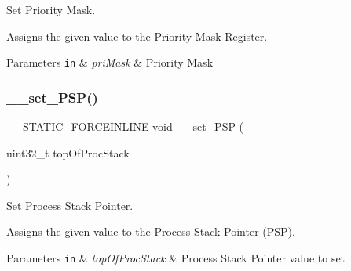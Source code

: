 Set Priority Mask. 

Assigns the given value to the Priority Mask Register. 
\begin{DoxyParams}[1]{Parameters}
\mbox{\tt in}  & {\em pri\+Mask} & Priority Mask \\
\hline
\end{DoxyParams}
\mbox{\label{group___c_m_s_i_s___core___reg_acc_functions_ga21f50fc02c3927a8ebf0bc3678c06862}} 
\subsubsection{\texorpdfstring{\+\_\+\+\_\+set\+\_\+\+P\+S\+P()}{\_\_set\_PSP()}}
{\footnotesize\ttfamily \+\_\+\+\_\+\+S\+T\+A\+T\+I\+C\+\_\+\+F\+O\+R\+C\+E\+I\+N\+L\+I\+NE void \+\_\+\+\_\+set\+\_\+\+P\+SP (\begin{DoxyParamCaption}\item[{uint32\+\_\+t}]{top\+Of\+Proc\+Stack }\end{DoxyParamCaption})}



Set Process Stack Pointer. 

Assigns the given value to the Process Stack Pointer (P\+SP). 
\begin{DoxyParams}[1]{Parameters}
\mbox{\tt in}  & {\em top\+Of\+Proc\+Stack} & Process Stack Pointer value to set \\
\hline
\end{DoxyParams}
